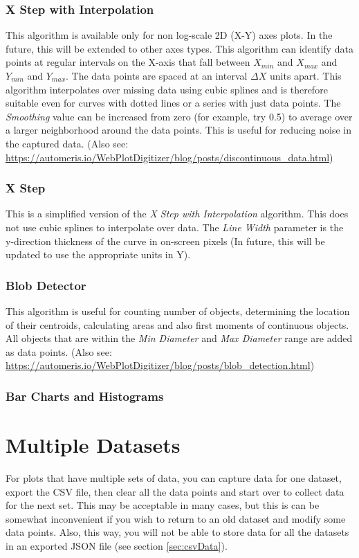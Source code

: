 \documentclass[letterpaper, 11pt]{article}
\begin{document}
\subsubsection{X Step with Interpolation}
This algorithm is available only for non log-scale 2D (X-Y) axes plots. In the future, this will be extended to other axes types. This algorithm can identify data points at regular intervals on the X-axis that fall between $X_{min}$ and $X_{max}$ and $Y_{min}$ and $Y_{max}$. The data points are spaced at an interval $\Delta X$ units apart. This algorithm interpolates over missing data using cubic splines and is therefore suitable even for curves with dotted lines or a series with just data points. The \emph{Smoothing} value can be increased from zero (for example, try 0.5) to average over a larger neighborhood around the data points. This is useful for reducing noise in the captured data. (Also see: \url{https://automeris.io/WebPlotDigitizer/blog/posts/discontinuous_data.html})

\subsubsection{X Step}
This is a simplified version of the \emph{X Step with Interpolation} algorithm. This does not use cubic splines to interpolate over data. The \emph{Line Width} parameter is the y-direction thickness of the curve in on-screen pixels (In future, this will be updated to use the appropriate units in Y). 

\subsubsection{Blob Detector}
This algorithm is useful for counting number of objects, determining the location of their centroids, calculating areas and also first moments of continuous objects. All objects that are within the \emph{Min Diameter} and \emph{Max Diameter} range are added as data points. (Also see: \url{https://automeris.io/WebPlotDigitizer/blog/posts/blob_detection.html})

\subsubsection{Bar Charts and Histograms}

\section{Multiple Datasets}
\label{sec:multipleDatasets}
For plots that have multiple sets of data, you can capture data for one dataset, export the CSV file, then clear all the data points and start over to collect data for the next set. This may be acceptable in many cases, but this is can be somewhat inconvenient if you wish to return to an old dataset and modify some data points. Also, this way, you will not be able to store data for all the datasets in an exported JSON file (see section \ref{sec:csvData}). 
\end{document}

